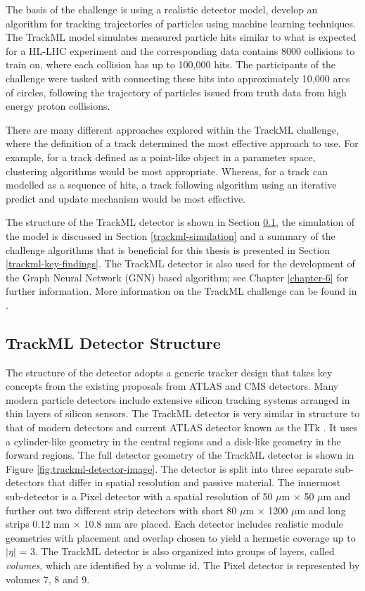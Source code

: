 The basis of the challenge is using a realistic detector model, develop an algorithm for tracking trajectories of particles using machine learning techniques. The TrackML model simulates measured particle hits similar to what is expected for a HL-LHC experiment and the corresponding data contains 8000 collisions to train on, where each collision has up to 100,000 hits. The participants of the challenge were tasked with connecting these hits into approximately 10,000 arcs of circles, following the trajectory of particles issued from truth data from high energy proton collisions. 

There are many different approaches explored within the TrackML challenge, where the definition of a track determined the most effective approach to use. For example, for a track defined as a point-like object in a parameter space, clustering algorithms would be most appropriate. Whereas, for a track can modelled as a sequence of hits, a track following algorithm using an iterative predict and update mechanism would be most effective.

The structure of the TrackML detector is shown in Section \ref{trackml-structure}, the simulation of the model is discussed in Section \ref{trackml-simulation} and a summary of the challenge algorithms that is beneficial for this thesis is presented in Section \ref{trackml-key-findings}. The TrackML detector is also used for the development of the Graph Neural Network (GNN) based algorithm; see Chapter \ref{chapter-6} for further information. More information on the TrackML challenge can be found in \cite{Amrouche_2019}.

\subsection{TrackML Detector Structure}
\label{trackml-structure}
The structure of the detector adopts a generic tracker design that takes key concepts from the existing proposals from ATLAS and CMS detectors. Many modern particle detectors include extensive silicon tracking systems arranged in thin layers of silicon sensors. The TrackML detector is very similar in structure to that of modern detectors and current ATLAS detector known as the ITk \cite{inner-detector-TDR}. It uses a cylinder-like geometry in the central regions and a disk-like geometry in the forward regions. The full detector geometry of the TrackML detector is shown in Figure \ref{fig:trackml-detector-image}. The detector is split into three separate sub-detectors that differ in spatial resolution and passive material. The innermost sub-detector is a Pixel detector with a spatial resolution of 50 $\mu$m $\times$ 50 $\mu$m and further out two different strip detectors with short 80 $\mu$m × 1200 $\mu$m and long strips 0.12 mm $\times$ 10.8 mm are placed. Each detector includes realistic module geometries with placement and overlap chosen to yield a hermetic coverage up to $\lvert \eta \rvert$ = 3. The TrackML detector is also organized into groups of layers, called \textit{volumes}, which are identified by a volume id. The Pixel detector is represented by volumes 7, 8 and 9.

